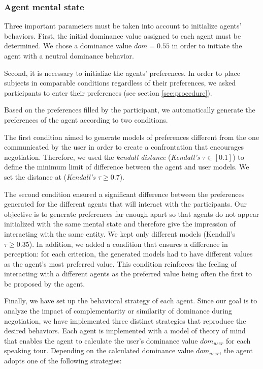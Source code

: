 \documentclass{llncs}
\begin{document}
	\subsubsection{Agent mental state}		
	Three important parameters must be taken into account to initialize agents' behaviors. 
	First, the initial dominance value assigned to each agent must be determined. We chose a dominance value $dom =0.55$ in order to initiate the agent with a neutral dominance behavior.
	
	Second, it is necessary to initialize the agents' preferences. In order to place subjects in comparable conditions regardless of their preferences, we asked participants to enter their preferences (see section \ref{sec:procedure}).
	
	Based on the preferences filled by the participant, we automatically generate the preferences of the agent  according to two conditions.
	
	The first condition aimed to generate models of preferences different from the one communicated by the user in order to create a confrontation that encourages negotiation. Therefore, we used the \textit{kendall distance} \cite{bra2013Kendall} (\emph{Kendall's $ \tau \in[0.1]$}) to define the minimum limit of difference between the agent and user models. We set the distance at (\emph{Kendall's $ \tau \geq 0.7$}).

The second condition ensured a significant difference between the preferences generated for the different agents that will interact with the participants. 
Our objective is to generate preferences far enough apart so that agents do not appear initialized with the same mental state and therefore give the impression of interacting with the same entity. We kept only different models (Kendall's $ \tau \geq 0.35$). In addition, we added a condition that ensures a difference in perception: for each criterion, the  generated models had to have different values as the agent's most preferred value. 
This condition reinforces the feeling of interacting with a different agents as the preferred value being often the first to be proposed by the agent. 

Finally, we have set up the behavioral strategy of each agent. Since our goal is to analyze the impact of complementarity or similarity of dominance during negotiation, we have implemented three distinct strategies that reproduce the desired behaviors. 
Each agent is implemented with a model of theory of mind that enables the agent to calculate the user's dominance value $dom_{user}$ for each speaking tour. Depending on the calculated dominance value $dom_{user}$, the agent adopts one of the following strategies:
\end{document}
